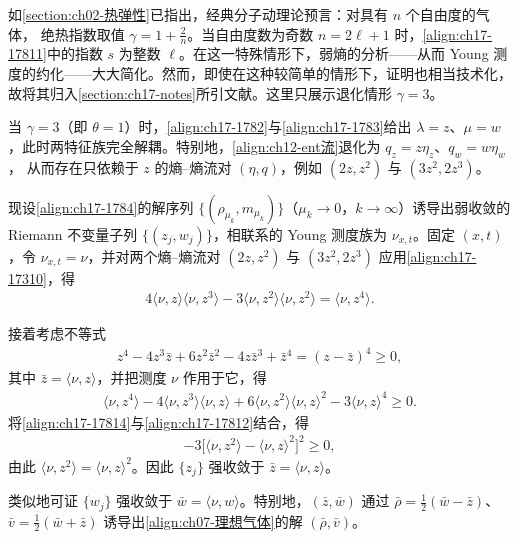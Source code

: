 \documentclass[../../main.tex]{subfiles}
\begin{document}
如\cref{section:ch02-热弹性}已指出，经典分子动理论预言：对具有 $n$ 个自由度的气体，
绝热指数取值 $\gamma=1+\frac{2}{n}$。当自由度数为奇数 $n=2\ell+1$ 时，\eqref{align:ch17-17811}中的指数 $s$ 为整数 $\ell$。在这一特殊情形下，弱熵的分析——从而 Young 测度的约化——大大简化。然而，即使在这种较简单的情形下，证明也相当技术化，故将其归入\cref{section:ch17-notes}所引文献。这里只展示退化情形 $\gamma=3$。

当 $\gamma=3$（即 $\theta=1$）时，\eqref{align:ch17-1782}与\eqref{align:ch17-1783}给出 $\lambda=z$、$\mu=w$，此时两特征族完全解耦。特别地，\eqref{align:ch12-ent流}退化为 $q_z=z\eta_z$、$q_w=w\eta_w$，
从而存在只依赖于 $z$ 的熵--熵流对 $(\eta,q)$，例如 $(2z,z^2)$ 与 $(3z^2,2z^3)$。

现设\eqref{align:ch17-1784}的解序列 $\{(\rho_{\mu_k},m_{\mu_k})\}$（$\mu_k\to0$，$k\to\infty$）诱导出弱收敛的 Riemann 不变量子列 $\{(z_j,w_j)\}$，相联系的 Young 测度族为 $\nu_{x,t}$。固定 $(x,t)$，令 $\nu_{x,t}=\nu$，并对两个熵--熵流对 $(2z,z^2)$ 与 $(3z^2,2z^3)$ 应用\eqref{align:ch17-17310}，得
\begin{align}
4\langle\nu,z\rangle\langle\nu,z^3\rangle-3\langle\nu,z^2\rangle\langle\nu,z^2\rangle=\langle\nu,z^4\rangle.
\label{align:ch17-17812}
\end{align}

接着考虑不等式
\begin{align}
z^4-4z^3\bar z+6z^2\bar z^2-4z\bar z^3+\bar z^4=(z-\bar z)^4\geqslant0,
\label{align:ch17-17813}
\end{align}
其中 $\bar z=\langle\nu,z\rangle$，并把测度 $\nu$ 作用于它，得
\begin{align}
\langle\nu,z^4\rangle-4\langle\nu,z^3\rangle\langle\nu,z\rangle+6\langle\nu,z^2\rangle\langle\nu,z\rangle^2-3\langle\nu,z\rangle^4\geqslant0.
\label{align:ch17-17814}
\end{align}
将\eqref{align:ch17-17814}与\eqref{align:ch17-17812}结合，得
\begin{align}
-3\bigl[\langle\nu,z^2\rangle-\langle\nu,z\rangle^2\bigr]^2\geqslant0,
\label{align:ch17-17815}
\end{align}
由此 $\langle\nu,z^2\rangle=\langle\nu,z\rangle^2$。因此 $\{z_j\}$ 强收敛于 $\bar z=\langle\nu,z\rangle$。

类似地可证 $\{w_j\}$ 强收敛于 $\bar w=\langle\nu,w\rangle$。特别地，$(\bar z,\bar w)$ 通过 $\bar\rho=\frac{1}{2}(\bar w-\bar z)$、$\bar v=\frac{1}{2}(\bar w+\bar z)$ 诱导出\eqref{align:ch07-理想气体}的解 $(\bar\rho,\bar v)$。
\end{document}
